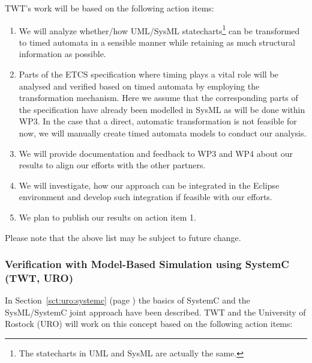 \documentclass{template/openetcs_report}
\begin{document}
TWT's work will be based on the following action items:
\begin{enumerate}
  \item We will analyze whether/how UML/SysML statecharts\footnote{The
statecharts in UML and SysML are actually the same.} can be
transformed to timed automata in a sensible manner while retaining as
much structural information as possible.
  \item Parts of the ETCS specification where timing plays a vital
role will be analysed and verified based on timed automata by employing
the transformation mechanism. Here we assume that the corresponding
parts of the specification have already been modelled in SysML as will
be done within WP3. In the case that a direct, automatic
transformation is not feasible for now, we will manually create timed
automata models to conduct our analysis.
  \item We will provide documentation and feedback to WP3 and WP4
about our results to align our efforts with the other partners.
  \item We will investigate, how our approach can be integrated in the
Eclipse environment and develop such integration if feasible with our
efforts.
  \item We plan to publish our results on action item 1.
\end{enumerate}

Please note that the above list may be subject to future change.

\subsubsection{Verification with Model-Based Simulation using SystemC (TWT, URO)}
\label{sec:model-based-sim-openETCS}

In Section~\ref{sct:uro:systemc} (page \pageref{sct:uro:systemc}) the
basics of SystemC and the SysML/SystemC joint approach have been
described. TWT and the University of Rostock (URO) will work on this
concept based on the following action items:
\end{document}
